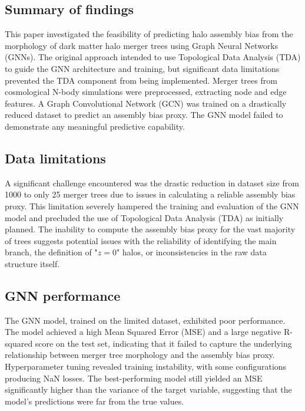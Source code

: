 \documentclass[twocolumn]{aastex631}
\begin{document}
\subsection{Summary of findings}

This paper investigated the feasibility of predicting halo assembly bias from the morphology of dark matter halo merger trees using Graph Neural Networks (GNNs). The original approach intended to use Topological Data Analysis (TDA) to guide the GNN architecture and training, but significant data limitations prevented the TDA component from being implemented. Merger trees from cosmological N-body simulations were preprocessed, extracting node and edge features. A Graph Convolutional Network (GCN) was trained on a drastically reduced dataset to predict an assembly bias proxy. The GNN model failed to demonstrate any meaningful predictive capability.

\subsection{Data limitations}

A significant challenge encountered was the drastic reduction in dataset size from 1000 to only 25 merger trees due to issues in calculating a reliable assembly bias proxy. This limitation severely hampered the training and evaluation of the GNN model and precluded the use of Topological Data Analysis (TDA) as initially planned. The inability to compute the assembly bias proxy for the vast majority of trees suggests potential issues with the reliability of identifying the main branch, the definition of "$z=0$" halos, or inconsistencies in the raw data structure itself.

\subsection{GNN performance}

The GNN model, trained on the limited dataset, exhibited poor performance. The model achieved a high Mean Squared Error (MSE) and a large negative R-squared score on the test set, indicating that it failed to capture the underlying relationship between merger tree morphology and the assembly bias proxy. Hyperparameter tuning revealed training instability, with some configurations producing NaN losses. The best-performing model still yielded an MSE significantly higher than the variance of the target variable, suggesting that the model's predictions were far from the true values.
\end{document}
